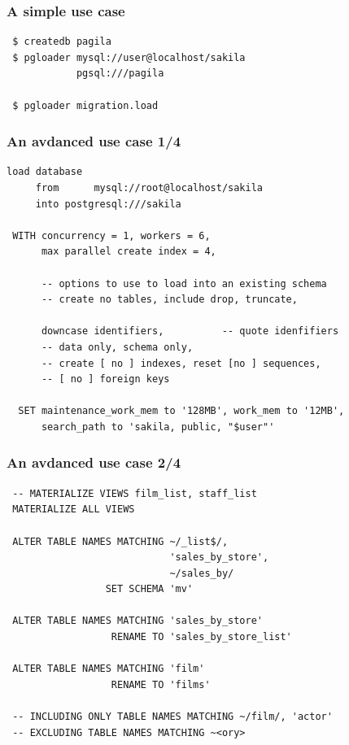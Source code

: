 \documentclass{beamer}
\begin{document}
\begin{frame}[fragile]
  \frametitle{A simple use case}

  \vfill

\begin{verbatim}
 $ createdb pagila
 $ pgloader mysql://user@localhost/sakila
            pgsql:///pagila

 $ pgloader migration.load
\end{verbatim}
\end{frame}

\begin{frame}[fragile]
  \frametitle{An avdanced use case 1/4}

\begin{verbatim}
load database
     from      mysql://root@localhost/sakila
     into postgresql:///sakila

 WITH concurrency = 1, workers = 6,
      max parallel create index = 4,

      -- options to use to load into an existing schema
      -- create no tables, include drop, truncate,

      downcase identifiers,          -- quote idenfifiers
      -- data only, schema only,
      -- create [ no ] indexes, reset [no ] sequences,
      -- [ no ] foreign keys

  SET maintenance_work_mem to '128MB', work_mem to '12MB',
      search_path to 'sakila, public, "$user"'
\end{verbatim}
\end{frame}

\begin{frame}[fragile]
  \frametitle{An avdanced use case 2/4}

\begin{verbatim}
 -- MATERIALIZE VIEWS film_list, staff_list
 MATERIALIZE ALL VIEWS

 ALTER TABLE NAMES MATCHING ~/_list$/,
                            'sales_by_store',
                            ~/sales_by/
                 SET SCHEMA 'mv'

 ALTER TABLE NAMES MATCHING 'sales_by_store'
                  RENAME TO 'sales_by_store_list'

 ALTER TABLE NAMES MATCHING 'film'
                  RENAME TO 'films'

 -- INCLUDING ONLY TABLE NAMES MATCHING ~/film/, 'actor'
 -- EXCLUDING TABLE NAMES MATCHING ~<ory>
\end{verbatim}
\end{frame}
\end{document}
